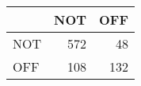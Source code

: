 \begin{tabular}{lrr}
\hline
     &   NOT &   OFF \\
\hline
 NOT &   572 &    48 \\
 OFF &   108 &   132 \\
\hline
\end{tabular}